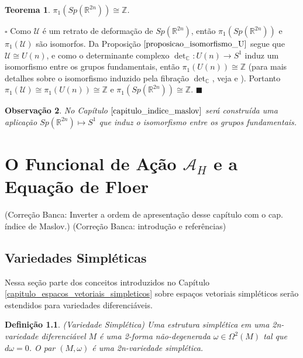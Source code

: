 \documentclass[12pt]{book}
\newtheorem{teorema}{Teorema}[section]
\newtheorem{definicao}[teorema]{Definição}
\newtheorem{observacao}[teorema]{Observação}
\newenvironment{prova}[1]{$\square$ #1}{\hfill$\blacksquare$}
\newcommand{\circulo}{S^{1}}
\newcommand{\complexo}[1]{\mathbb{C}^{#1}}
\newcommand{\funcionalH}{\mathcal{A}_{H}}
\newcommand{\grupofundamental}[1]{\pi_{1}(#1)}
\newcommand{\gruposimpletico}[1]{Sp(#1)}
\newcommand{\inteiros}{\mathbb{Z}}
\newcommand{\matrizSimpleticaOrtogonal}{\mathcal{U}}
\newcommand{\matrizunitaria}[1]{U(#1)}
\newcommand{\real}[1]{\mathbb{R}^{#1}}
\newcommand{\alerta}[1]{{\color{red}#1}}
\newcommand{\correcaobanca}[1]{\alerta{(Correção Banca: #1)}}
\begin{document}
	
	\begin{teorema}
		$\grupofundamental{\gruposimpletico{\real{2n}}} \cong \inteiros$.
	\end{teorema}
	\begin{prova}
		Como $\matrizSimpleticaOrtogonal$ é um retrato de deformação de $\gruposimpletico{\real{2n}}$, então $\grupofundamental{\gruposimpletico{\real{2n}}}$ e $\grupofundamental{\matrizSimpleticaOrtogonal}$ são isomorfos. Da Proposição $\ref{proposicao_isomorfismo_U}$ segue que $\matrizSimpleticaOrtogonal\cong \matrizunitaria{n}$, e como o determinante complexo $\det_{\complexo{}}: \matrizunitaria{n} \to \circulo$ induz um isomorfismo entre os grupos fundamentais, então $\grupofundamental{\matrizunitaria{n}}\cong \inteiros$ (para mais detalhes sobre o isomorfismo induzido pela fibração $\det_{\complexo{}}$, veja \cite{hatcher} e \cite{dusa}). Portanto $\grupofundamental{\matrizSimpleticaOrtogonal} \cong \grupofundamental{\matrizunitaria{n}} \cong \inteiros$ e $\grupofundamental{\gruposimpletico{\real{2n}}} \cong \inteiros$.
	\end{prova}
	
	\begin{observacao}
		No Capítulo $\ref{capitulo_indice_maslov}$ será construída uma aplicação $\gruposimpletico{\real{2n}}\mapsto \circulo$ que induz o isomorfismo entre os grupos fundamentais.
	\end{observacao}
	
	
	\chapter{O Funcional de Ação $\funcionalH$ e a Equação de Floer}
	\correcaobanca{Inverter a ordem de apresentação desse capítulo com o cap. índice de Maslov.}
	\correcaobanca{introdução e referências}
	\section{Variedades Simpléticas}\label{secao_variedade_simpletica}
	
	Nessa seção parte dos conceitos introduzidos no Capítulo \ref{capitulo_espacos_vetoriais_simpleticos} sobre espaços vetoriais simpléticos serão estendidos para variedades diferenciáveis.
	
	\begin{definicao}
		(Variedade Simplética) Uma estrutura simplética em uma 2n-variedade diferenciável $M$ é uma 2-forma não-degenerada $\omega\in \Omega^{2}(M)$ tal que $d\omega=0$. O par $(M, \omega)$ é uma 2n-variedade simplética.
	\end{definicao}
	
\end{document}
